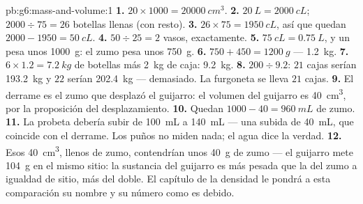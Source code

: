 \begin{solution}{pb:g6:mass-and-volume:1}
\textbf{1.} $20 \times 1000 = \qty{20000}{cm^3}$.
\textbf{2.} $\qty{20}{L} = \qty{2000}{cL}$; $2000 \div 75 = 26$
botellas llenas (con resto).
\textbf{3.} $26 \times 75 = \qty{1950}{cL}$, así que quedan
$2000 - 1950 = \qty{50}{cL}$.
\textbf{4.} $50 \div 25 = 2$ vasos, exactamente.
\textbf{5.} $\qty{75}{cL} = \qty{0.75}{L}$, y un  pesa unos
\qty{1000}{g}: el zumo pesa unos \qty{750}{g}.
\textbf{6.} $750 + 450 = \qty{1200}{g}$ --- \qty{1.2}{kg}.
\textbf{7.} $6 \times 1.2 = \qty{7.2}{kg}$ de botellas más
\qty{2}{kg} de caja: \qty{9.2}{kg}.
\textbf{8.} $200 \div 9.2$: $21$ cajas serían \qty{193.2}{kg} y $22$
serían \qty{202.4}{kg} --- demasiado. La furgoneta se lleva $21$
cajas.
\textbf{9.} El derrame es el zumo que desplazó el guijarro: el
volumen del guijarro es \qty{40}{cm^3}, por la proposición del
desplazamiento.
\textbf{10.} Quedan $1000 - 40 = \qty{960}{mL}$ de zumo.
\textbf{11.} La probeta debería subir de \qty{100}{mL} a
\qty{140}{mL} --- una subida de \qty{40}{mL}, que coincide con el
derrame. Los puños no miden nada; el agua dice la verdad.
\textbf{12.} Esos \qty{40}{cm^3}, llenos de zumo, contendrían unos
\qty{40}{g} de zumo --- el guijarro mete \qty{104}{g} en el mismo
sitio: la sustancia del guijarro es más pesada que la del zumo a
igualdad de sitio, más del doble. El capítulo de la densidad le pondrá
a esta comparación su nombre y su número como es debido.
\end{solution}
